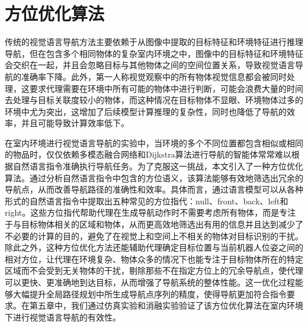\section{方位优化算法}
传统的视觉语言导航方法主要依赖于从图像中提取的目标特征和环境特征进行推理导航，但在包含多个相同物体的复杂室内环境之中，图像中的目标特征和环境特征会交织在一起，并且会忽略目标与其他物体之间的空间位置关系，导致视觉语言导航的准确率下降。此外，第一人称视觉观察中的所有物体视觉信息都会被同时处理，这要求代理需要在环境中所有可能的物体中进行判断，可能会浪费大量的时间去处理与目标关联度较小的物体，而这种情况在目标物体不显眼、环境物体过多的环境中尤为突出，这增加了后续模型计算推理的复杂性，同时也降低了导航的效率，并且可能导致计算效率低下。

在室内环境进行视觉语言导航的实验中，当环境的多个不同位置都包含相似或相同的物品时，仅仅依赖多模态融合网络和Dijkstra算法进行导航的智能体常常难以根据自然语言指令准确执行导航任务。为了克服这一挑战，本文引入了一种方位优化算法。通过分析自然语言指令中包含的方位语义，该算法能够有效地筛选出冗余的导航点，从而改善导航路径的准确性和效率。具体而言，通过语言模型可以从各种形式的自然语言指令中提取出五种常见的方位指代：null、front、back、left和right。这些方位指代帮助代理在生成导航动作时不需要考虑所有物体，而是专注于与目标物体相关的区域和物体，从而更高效地筛选出有用的信息并且达到减少了不必要的计算的目的，避免了在视觉上和空间上不相关的物体对目标识别的干扰。除此之外，这种方位优化方法还能辅助代理确定目标位置与当前机器人位姿之间的相对方位，让代理在环境复杂、物体众多的情况下也能专注于目标物体所在的特定区域而不会受到无关物体的干扰，剔除那些不在指定方位上的冗余导航点，使代理可以更快、更准确地到达目标，从而增强了导航系统的整体性能。这一优化过程能够大幅提升全局路径规划中所生成导航点序列的精度，使得导航更加符合指令要求。在第五章中，我们通过仿真实验和消融实验验证了该方位优化算法在室内环境下进行视觉语言导航的有效性。

